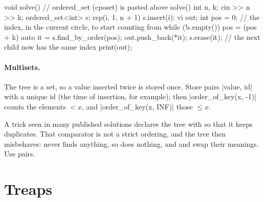\begin{code}
void solve() {  // ordered_set (cposet) is pasted above solve()
    int n, k;
    cin >> n >> k;
    ordered_set<int> s;
    rep(i, 1, n + 1) s.insert(i);
    vi out;
    int pos = 0;  // the index, in the current circle, to start counting from
    while (!s.empty()) {
        pos = (pos + k) %
        auto it = s.find_by_order(pos);
        out.push_back(*it);
        s.erase(it);  // the next child now has the same index
    }
    print(out);
}
\end{code}


\paragraph{Multisets.} The tree is a set, so a value inserted twice is stored once. Store pairs \cc|{value, id}| with a unique id
(the time of insertion, for example); then \cc|order_of_key({x, -1})| counts the elements $< x$, and \cc|order_of_key({x, INF})|
those $\le x$.

\begin{pitfall}
A trick seen in many published solutions declares the tree with  so that it keeps duplicates. That comparator is
not a strict ordering, and the tree then misbehaves:  never finds anything, so  does nothing, and
 and  swap their meanings. Use pairs.
\end{pitfall}

\section[Treaps]{Treaps \hfill \plat}\label{sec:treap}

